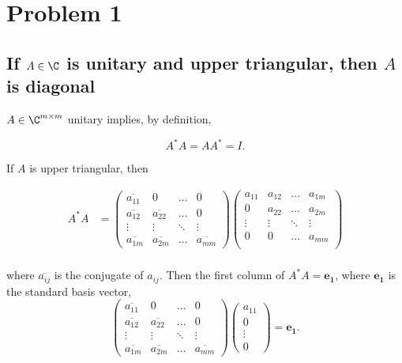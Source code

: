 
\subsectionfont{\fontsize{10}{10}\selectfont}

\graphicspath{{./assignment_01/figures/}}

\section{Problem 1}%
\label{sec:problem_1}
\subsection{If $A\in\C$ is unitary and upper triangular, then $A$ is diagonal}%
\label{sub:1.1}

$A\in\C^{m\times m}$ unitary implies, by definition,

\[
  A^{*}A = AA^{*} = I
.\] 

If $A$ is upper triangular, then 

\begin{align*}
  A^{*}A &= \begin{pmatrix}
              \overline{a_{11}} & 0 & \hdots & 0  \\
              \overline{a_{12}} & \overline{a_{22}} & \hdots & 0 \\
              \vdots & \vdots & \ddots & \vdots \\
              \overline{a_{1m}} & \overline{a_{2m}} & \hdots & \overline{a_{mm}}
            \end{pmatrix} 
            \begin{pmatrix}
               a_{11} & a_{12} & \dots & a_{1m} \\
               0 & a_{22} & \dots & a_{2m} \\
               \vdots & \vdots & \ddots & \vdots \\
               0 & 0 & \dots & a_{mm} \\
            \end{pmatrix} \\
\end{align*}

where $\overline{a_{ij}}$ is the conjugate of $a_{ij}$. Then the first column of
$A^{*}A=\bm{e_1}$, where $\bm{e_1}$ is the standard basis vector,
 \[
  \begin{pmatrix}
    \overline{a_{11}} & 0 & \hdots & 0  \\
    \overline{a_{12}} & \overline{a_{22}} & \hdots & 0 \\
    \vdots & \vdots & \ddots & \vdots \\
    \overline{a_{1m}} & \overline{a_{2m}} & \hdots & \overline{a_{mm}}
  \end{pmatrix}
  \begin{pmatrix} a_{11} \\ 0 \\ \vdots \\ 0 \end{pmatrix} = \bm{e_1}
.\] 

